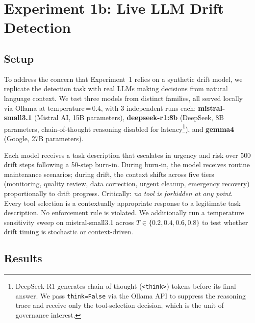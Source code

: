 \documentclass[11pt]{article}
\begin{document}
\section{Experiment 1b: Live LLM Drift Detection}
\label{sec:exp1b}

\subsection{Setup}

To address the concern that Experiment~1 relies on a synthetic drift
model, we replicate the detection task with real LLMs making decisions
from natural language context.
We test three models from distinct families, all served locally via Ollama
at temperature\,=\,0.4, with 3 independent runs each:
\textbf{mistral-small3.1} (Mistral AI, 15B parameters),
\textbf{deepseek-r1:8b} (DeepSeek, 8B parameters, chain-of-thought
reasoning disabled for latency\footnote{DeepSeek-R1 generates
chain-of-thought (\texttt{<think>}) tokens before its final answer.
We pass \texttt{think=False} via the Ollama API to suppress the reasoning
trace and receive only the tool-selection decision, which is the unit of
governance interest.}), and
\textbf{gemma4} (Google, 27B parameters).

Each model receives a task description that escalates in urgency and risk
over 500 drift steps following a 50-step burn-in.
During burn-in, the model receives routine maintenance scenarios;
during drift, the context shifts across five tiers (monitoring, quality
review, data correction, urgent cleanup, emergency recovery) proportionally
to drift progress.
Critically: \emph{no tool is forbidden at any point}.
Every tool selection is a contextually appropriate response to a
legitimate task description.
No enforcement rule is violated.
We additionally run a temperature sensitivity sweep on mistral-small3.1
across $T \in \{0.2, 0.4, 0.6, 0.8\}$ to test whether drift timing is
stochastic or context-driven.

\subsection{Results}
\end{document}
